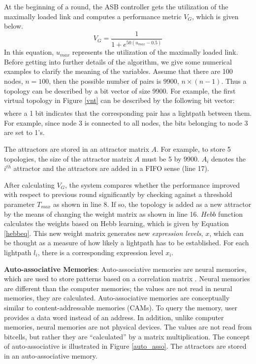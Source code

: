 \documentclass[conference]{IEEEtran}
\begin{document}
 At the beginning of a round, the ASB controller 
 gets the utilization of the maximally loaded link and computes a performance  metric $V_G$, which is given below.
  \begin{equation}\label{activityvsmax}
 V_G = \frac{1}{1+e^{50(u_{max}-0.5)}}
\end{equation} 
In this equation, $u_{max}$ represents the utilization of the maximally loaded link.
Before getting  into further details of the algorithm, we give some  numerical examples to clarify the meaning of the variables.
 Assume that there are 100 nodes, $n=100$, then the possible number of pairs is 9900, $n\times(n-1)$. Thus a topology can be described by a bit vector of size 9900.
For example, the first virtual topology in Figure \ref{vnt} can be described by the following bit vector:
\begin{align}
 [ \underbrace{0 1 0}_\text{node 1}\:\:  \underbrace{0 1 1}_\text{node 2}\:\:  \underbrace{ 1 1  1}_\text{node 3}\:\:  \underbrace{ 0 1 1}_\text{node 4} ] 
\end{align}
where a 1 bit indicates that the corresponding pair has a lightpath between them. For example, since node 3 is connected to all nodes, the bits belonging to node 3 are set to 1's.
 
The attractors are stored in an attractor matrix $A$.
For example, to store 5 topologies, the size of the attractor matrix $A$ must be 5 by 9900. 
$A_i$ denotes the $i^{th}$ attractor and the attractors are added in a FIFO sense (line 17).

After calculating $V_G$, the system compares whether the performance improved with respect to previous round significantly 
by checking against a threshold parameter $T_{max}$ as shown in line 8. 
If so, the topology is added as a new attractor by the means of changing the weight matrix as shown in line 16. $Hebb$ function
calculates the weights based on Hebb learning, which is given by Equation \ref{hebbeq}.
This new weight matrix generates new {\em expression levels}, $x$, which can be thought as a measure of how likely a lightpath has to be established.
For each lightpath $l_i$, there is a corresponding expression level $x_i$.

{\bf Auto-associative Memories}:
Auto-associative memories are neural memories, which are used to store patterns  based on a correlation matrix \cite{Kohonen:CMM72}.  
Neural memories are different than the computer memories; the values are not read in neural memories, they are calculated.
Auto-associative memories are conceptually similar to content-addressable memories (CAMs). 
To query the memory, user provides a data word instead of an address.
In addition, unlike computer memories, neural memories are not physical devices. 
The values are not read from bitcells,  but rather they are ``calculated'' by a matrix multiplication.
The concept of auto-associative is illustrated in Figure \ref{auto_asso}.
  The attractors are stored in an auto-associative memory.
  
\end{document}
